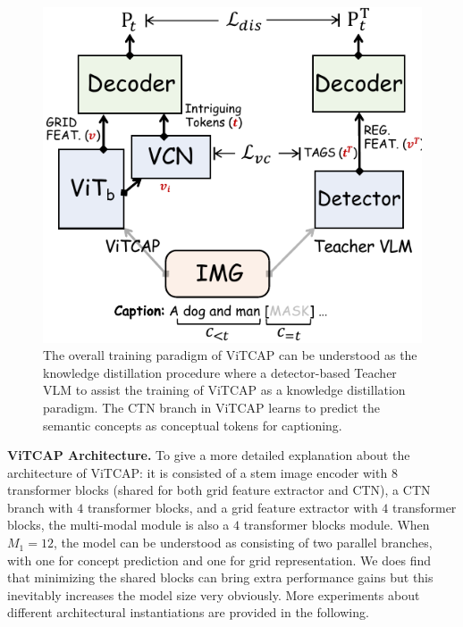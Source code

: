 \begin{figure}[t]
  \begin{center}
  \includegraphics[width=.76\textwidth]{./images/distillation.pdf}
  \end{center}
  \vspace{-6mm}
    \caption[The overall training paradigm of ViTCAP.]{\small The overall training paradigm of ViTCAP can be understood as the knowledge distillation procedure where a detector-based Teacher VLM to assist the training of ViTCAP as a knowledge distillation paradigm. The CTN branch in ViTCAP learns to predict the semantic concepts as conceptual tokens for captioning. }
    \vspace{-2mm}
  \label{fig:distillation}
\end{figure}


\vspace{1mm}
\noindent \textbf{ViTCAP Architecture.} To give a more detailed explanation about the architecture of ViTCAP: it is consisted of a stem image encoder with $8$ transformer blocks (shared for both grid feature extractor and CTN), a CTN branch with $4$ transformer blocks, and a grid feature extractor with $4$ transformer blocks, the multi-modal module is also a $4$ transformer blocks module. When $M_1=12$, the model can be understood as consisting of two parallel branches, with one for concept prediction and one for grid representation. We does find that minimizing the shared blocks can bring extra performance gains but this inevitably increases the model size very obviously.
More experiments about different architectural instantiations are provided in the following.


